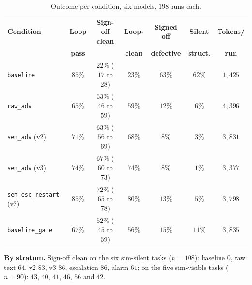 \documentclass[11pt]{article}
\newcommand{\cond}[1]{\texttt{#1}}
\begin{document}
\begin{table}[htbp]
\centering
\caption{Outcome per condition, six models, $198$ runs each.}
\label{tab:s-p3-pooled}
\small
\begin{tabular}{@{}l c c c c c c@{}}
\toprule
\textbf{Condition} & \textbf{Loop} & \textbf{Sign-off clean} & \textbf{Loop-} & \textbf{Signed off} & \textbf{Silent} & \textbf{Tokens/} \\
                   & \textbf{pass} &                         & \textbf{clean} & \textbf{defective}  & \textbf{struct.} & \textbf{run} \\
\midrule
\cond{baseline}               & $85\%$ & $22\%$ ($17$ to $28$) & $23\%$ & $63\%$ & $62\%$ & $1{,}425$ \\
\cond{raw\_adv}               & $65\%$ & $53\%$ ($46$ to $59$) & $59\%$ & $12\%$ & $6\%$  & $4{,}396$ \\
\cond{sem\_adv} (v2)          & $71\%$ & $63\%$ ($56$ to $69$) & $68\%$ & $8\%$  & $3\%$  & $3{,}831$ \\
\cond{sem\_adv} (v3)          & $74\%$ & $67\%$ ($60$ to $73$) & $74\%$ & $8\%$  & $1\%$  & $3{,}377$ \\
\cond{sem\_esc\_restart} (v3) & $85\%$ & $72\%$ ($65$ to $78$) & $80\%$ & $13\%$ & $5\%$ & $3{,}798$ \\
\cond{baseline\_gate}         & $67\%$ & $52\%$ ($45$ to $59$) & $56\%$ & $15\%$ & $11\%$ & $3{,}835$ \\
\bottomrule
\end{tabular}
\end{table}

\textbf{By stratum.} Sign-off clean on the six sim-silent tasks ($n{=}108$):
baseline $0$, raw text $64$, v2 $83$, v3 $86$, escalation $86$, alarm $61$; on
the five sim-visible tasks ($n{=}90$): $43$, $40$, $41$, $46$, $56$ and $42$.
\end{document}
